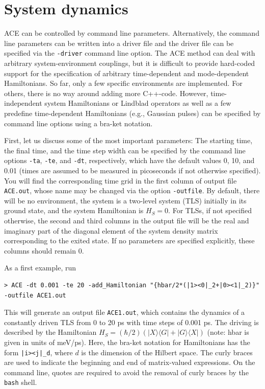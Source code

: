\documentclass{scrartcl}
\begin{document}
\section{System dynamics}
ACE can be controlled by command line parameters. 
Alternatively, the command line parameters can be written into a driver file
and the driver file can be specified via the \texttt{-driver} command line 
option.
%
The ACE method can deal with arbitrary system-environment couplings, but it
is difficult to provide hard-coded support for the specification of arbitrary 
time-dependent and mode-dependent Hamiltonians. 
So far, only a few specific environments are implemented. 
For others, there is no way around adding more C++-code. 
However, time-independent system Hamiltonians or Lindblad operators as well as
a few predefine time-dependent Hamiltonians (e.g., Gaussian pulses) 
can be specified by command line options using a bra-ket notation.

First, let us discuss some of the most important parameters:
The starting time, the final time, and the time step width can be specified
by the command line options \texttt{-ta}, \texttt{-te}, and \texttt{-dt}, 
respectively, which have the default values 0, 10, and 0.01 
(times are assumed to be measured in picoseconds if not otherwise specified).
You will find the corresponding time grid in the first column of output file
\texttt{ACE.out}, whose name may be changed via the option \texttt{-outfile}.
By default, there will be no environment, the system is a two-level system
(TLS) initially in its ground state, and the system Hamiltonian is $H_S=0$. 
For TLSs, if not specified otherwise, the second and third
columns in the output file will be the real and imaginary part of the 
diagonal element of the system density matrix corresponding to the exited state.
If no parameters are specified explicitly, these columns should remain 0.

As a first example, run
\begin{verbatim}
> ACE -dt 0.001 -te 20 -add_Hamiltonian "{hbar/2*(|1><0|_2+|0><1|_2)}" -outfile ACE1.out
\end{verbatim}
This will generate an output file \texttt{ACE1.out}, which contains the dynamics
of a constantly driven TLS from 0 to 20 ps with time steps of 0.001 ps.
The driving is described by the Hamiltonian 
$H_S=(\hbar/2)(|X\rangle\langle G|+|G\rangle\langle X|)$ (note: hbar is given
in units of meV/ps).
Here, the bra-ket notation for Hamiltonians has the form 
\texttt{|i><j|\_d}, where $d$ is the dimension of the Hilbert space.
The curly braces are used to indicate the beginning and end of matrix-valued
expressions. On the command line, quotes are required to avoid the removal
of curly braces by the \texttt{bash} shell.
\end{document}
